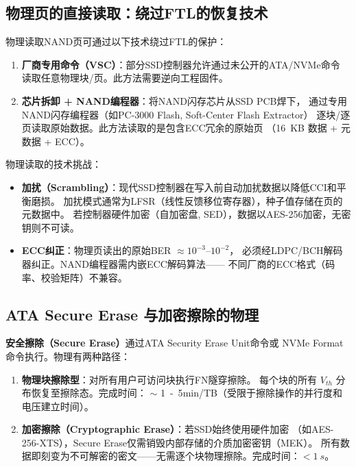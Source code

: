 \documentclass[11pt,a4paper,twoside]{article}
\theoremstyle{definition}\newtheorem{definition}{定义}[section]
\theoremstyle{plain}\newtheorem{theorem}{定理}[section]
\theoremstyle{remark}\newtheorem{remark}{注解}[section]
\begin{document}
\subsection{物理页的直接读取：绕过FTL的恢复技术}

物理读取NAND页可通过以下技术绕过FTL的保护：

\begin{enumerate}
  \item \textbf{厂商专用命令（VSC）}：部分SSD控制器允许通过未公开的ATA/NVMe命令
  读取任意物理块/页。此方法需要逆向工程固件。
  \item \textbf{芯片拆卸 + NAND编程器}：将NAND闪存芯片从SSD PCB焊下，
  通过专用NAND闪存编程器（如PC-3000 Flash, Soft-Center Flash Extractor）
  逐块/逐页读取原始数据。此方法读取的是包含ECC冗余的原始页
  （\SI{16}{KB} 数据 + 元数据 + ECC）。
\end{enumerate}

物理读取的技术挑战：
\begin{itemize}
  \item \textbf{加扰（Scrambling）}：现代SSD控制器在写入前自动加扰数据以降低CCI和平衡磨损。
  加扰模式通常为LFSR（线性反馈移位寄存器），种子值存储在页的元数据中。
  若控制器硬件加密（自加密盘, SED），数据以AES-256加密，无密钥则不可读。
  \item \textbf{ECC纠正}：物理页读出的原始BER $\approx 10^{-3}$--$10^{-2}$，
  必须经LDPC/BCH解码器纠正。NAND编程器需内嵌ECC解码算法——
  不同厂商的ECC格式（码率、校验矩阵）不兼容。
\end{itemize}

\subsection{ATA Secure Erase 与加密擦除的物理}

\textbf{安全擦除（Secure Erase）}通过ATA Security Erase Unit命令或
NVMe Format命令执行。物理有两种路径：
\begin{enumerate}
  \item \textbf{物理块擦除型}：对所有用户可访问块执行FN隧穿擦除。
  每个块的所有 $V_{th}$ 分布恢复至擦除态。完成时间：
  $\sim$ \SI{1}{-5}{min/TB}（受限于擦除操作的并行度和电压建立时间）。
  \item \textbf{加密擦除（Cryptographic Erase）}：若SSD始终使用硬件加密
  （如AES-256-XTS），Secure Erase仅需销毁内部存储的介质加密密钥（MEK）。
  所有数据即刻变为不可解密的密文——无需逐个块物理擦除。完成时间：$< \SI{1}{s}$。
\end{enumerate}
\end{document}
